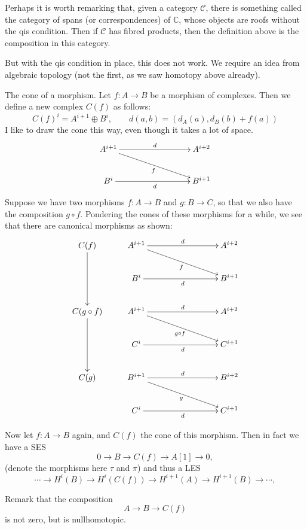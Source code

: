 \documentclass[12pt]{article}
\theoremstyle{plain}
\theoremstyle{definition}
\numberwithin{equation}{section}
\newcommand{\C}{\mathbb{C}}
\newcommand{\CC}{\mathcal{C}}
\begin{document}
Perhaps it is worth remarking that, given a category $\CC$, there is something called the category of spans (or correspondences) of $\C$, whose objects are roofs without the qis condition. Then if $\CC$ has fibred products, then the definition above is the composition in this category.

But with the qis condition in place, this does not work. We require an idea from algebraic topology (not the first, as we saw homotopy above already).

The cone of a morphism. Let $f : A \rightarrow B$ be a morphism of complexes. Then we define a new complex $C(f)$ as follows:
\[
C(f)^i = A^{i+1} \oplus B^i, \qquad d(a, b) = (d_A(a), d_B(b) + f(a))
\]
I like to draw the cone this way, even though it takes a lot of space.
\begin{align*}
\xymatrix{
A^{i+1} \ar@{->}[rrr]^{d} \ar@{->}[drrr]_{f} & & & A^{i+2} \\
%
B^i \ar@{->}[rrr]_{d} & & & B^{i+1} \\
}
\end{align*}
Suppose we have two morphisms $f : A \rightarrow B$ and $g : B \rightarrow C$, so that we also have the composition $g \circ f$. Pondering the cones of these morphisms for a while, we see that there are canonical morphisms as shown:
\begin{align*}
\xymatrix{
C(f) \ar@{->}[dd] & A^{i+1} \ar@{->}[rrr]^{d} \ar@{->}[drrr]_{f} & & & A^{i+2} \\
%
 & B^i \ar@{->}[rrr]_{d} & & & B^{i+1} \\
%
C(g \circ f) \ar@{->}[dd] & A^{i+1} \ar@{->}[rrr]^{d} \ar@{->}[drrr]_{g \circ f} & & & A^{i+2} \\
%
 & C^i \ar@{->}[rrr]_{d} & & & C^{i+1} \\
%
C(g) & B^{i+1} \ar@{->}[rrr]^{d} \ar@{->}[drrr]_{g} & & & B^{i+2} \\
%
 & C^i \ar@{->}[rrr]_{d} & & & C^{i+1} \\
}
\end{align*}

Now let $f : A \rightarrow B$ again, and $C(f)$ the cone of this morphism. Then in fact we have a SES
\[
0 \rightarrow B \rightarrow C(f) \rightarrow A[1] \rightarrow 0,
\]
(denote the morphisms here $\tau$ and $\pi$) and thus a LES
\[
\cdots \rightarrow H^i(B) \rightarrow H^i(C(f)) \rightarrow H^{i+1}(A) \rightarrow H^{i+1}(B) \rightarrow \cdots,
\]


{\color{red}Remark that the composition
\[
A \rightarrow B \rightarrow C(f)
\]
is not zero, but is nullhomotopic.
}
\end{document}
